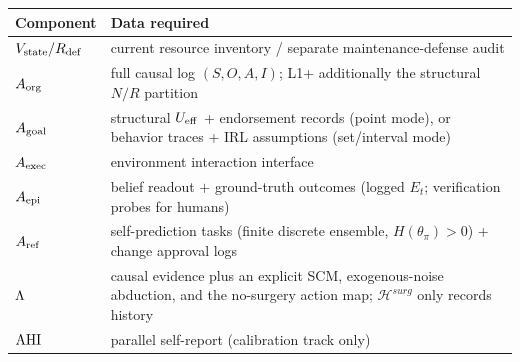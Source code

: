 \begin{center}\small
\begin{tabularx}{\textwidth}{@{}l >{\raggedright\arraybackslash}X@{}}
\toprule
Component & Data required \\
\midrule
$V_{\mathrm{state}}/R_{\mathrm{def}}$ & current resource inventory / separate maintenance-defense audit \\
$A_{\mathrm{org}}$ & full causal log $(S,O,A,I)$; L1+ additionally the structural $N/R$
partition \\
$A_{\mathrm{goal}}$ & structural $U_{\mathrm{eff}}$ + endorsement records (point mode), or behavior
traces + IRL assumptions (set/interval mode) \\
$A_{\mathrm{exec}}$ & environment interaction interface \\
$A_{\mathrm{epi}}$ & belief readout $+$ ground-truth outcomes (logged $E_t$;
verification probes for humans) \\
$A_{\mathrm{ref}}$ & self-prediction tasks (finite discrete ensemble,
$H(\theta_\pi)>0$) + change approval logs \\
$\Lambda$ & causal evidence plus an explicit SCM, exogenous-noise abduction,
and the no-surgery action map; $\mathcal H^{surg}$ only records history \\
$\mathrm{AHI}$ & parallel self-report (calibration track only) \\
\bottomrule
\end{tabularx}
\end{center}

